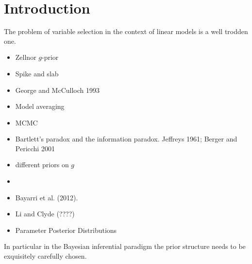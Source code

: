 \documentclass{article}[12pt]
\begin{document}
\section{Introduction}

The problem of variable selection in the context of linear models is a well trodden one. 

\begin{itemize}
	\item Zellnor $g$-prior
	
	\item Spike and slab
	
	\item George and McCulloch 1993
	
	\item Model averaging
	
	\item MCMC
	
	\item Bartlett's paradox and the information paradox. Jeffreys 1961; Berger and Pericchi 2001
	
	\item \cite{Liang2008} different priors on $g$
	
	\item \cite{Maruyama2011} 
	
	\item Bayarri et al. (2012).
	
	\item Li and Clyde (????)
	
	\item Parameter Posterior Distributions
\end{itemize}



In particular
in the Bayesian inferential paradigm the prior structure needs to be exquisitely carefully chosen.
\end{document}
